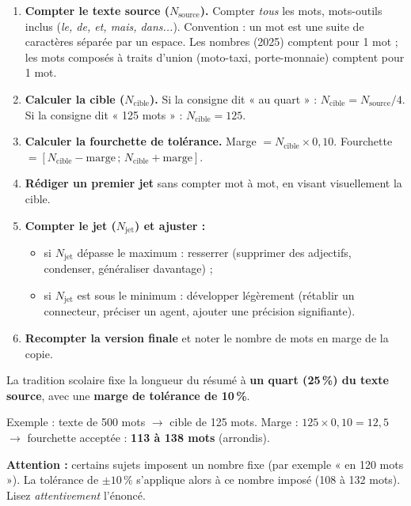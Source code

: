 \documentclass[11pt]{article}
\begin{document}
\begin{methode}
\begin{enumerate}
    \item \textbf{Compter le texte source ($N_{\text{source}}$).} Compter \emph{tous} les mots, mots-outils inclus (\emph{le, de, et, mais, dans...}). Convention : un mot est une suite de caractères séparée par un espace. Les nombres (2025) comptent pour 1 mot ; les mots composés à traits d'union (moto-taxi, porte-monnaie) comptent pour 1 mot.
    \item \textbf{Calculer la cible ($N_{\text{cible}}$).} Si la consigne dit « au quart » : $N_{\text{cible}} = N_{\text{source}} / 4$. Si la consigne dit « 125 mots » : $N_{\text{cible}} = 125$.
    \item \textbf{Calculer la fourchette de tolérance.} Marge $= N_{\text{cible}} \times 0{,}10$. Fourchette $= [N_{\text{cible}} - \text{marge}\,;\,N_{\text{cible}} + \text{marge}]$.
    \item \textbf{Rédiger un premier jet} sans compter mot à mot, en visant visuellement la cible.
    \item \textbf{Compter le jet ($N_{\text{jet}}$) et ajuster :}
    \begin{itemize}
        \item si $N_{\text{jet}}$ dépasse le maximum : resserrer (supprimer des adjectifs, condenser, généraliser davantage) ;
        \item si $N_{\text{jet}}$ est sous le minimum : développer légèrement (rétablir un connecteur, préciser un agent, ajouter une précision signifiante).
    \end{itemize}
    \item \textbf{Recompter la version finale} et noter le nombre de mots en marge de la copie.
\end{enumerate}
\end{methode}

\begin{savaistu}
La tradition scolaire fixe la longueur du résumé à \textbf{un quart (25\,\%) du texte source}, avec une \textbf{marge de tolérance de 10\,\%}.
\par Exemple : texte de 500 mots $\to$ cible de 125 mots. Marge : $125 \times 0{,}10 = 12{,}5$ $\to$ fourchette acceptée : \textbf{113 à 138 mots} (arrondis).
\par \textbf{Attention :} certains sujets imposent un nombre fixe (par exemple « en 120 mots »). La tolérance de $\pm 10\,\%$ s'applique alors à ce nombre imposé (108 à 132 mots). Lisez \emph{attentivement} l'énoncé.
\end{savaistu}
\end{document}
